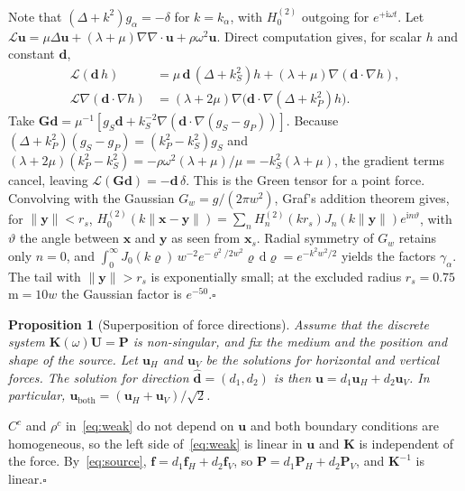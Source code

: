 \documentclass[preprint,12pt]{elsarticle}
\newcommand{\mbf}[1]{\mathbf{#1}}
\newcommand{\qedbox}{\hfill$\square$}
\newtheorem{proposition}{Proposition}
\begin{document}
\begin{pf}
Note that $(\Delta+k^2)g_\alpha=-\delta$ for $k=k_\alpha$, with $H_0^{(2)}$ outgoing for $e^{+\mathrm{i}\omega t}$. Let
$\mathcal{L}\mbf{u}=\mu\Delta\mbf{u}+(\lambda+\mu)\nabla\nabla\cdot\mbf{u}+\rho\omega^2\mbf{u}$. Direct computation gives, for scalar $h$ and constant $\mbf{d}$,
\begin{align*}
  \mathcal{L}(\mbf{d}\,h)&=\mu\,\mbf{d}\,(\Delta+k_S^2)h+(\lambda+\mu)\nabla(\mbf{d}\cdot\nabla h),\\
  \mathcal{L}\nabla(\mbf{d}\cdot\nabla h)&=(\lambda+2\mu)\nabla\bigl(\mbf{d}\cdot\nabla(\Delta+k_P^2)h\bigr).
\end{align*}
Take $\mbf{G}\mbf{d}=\mu^{-1}[g_S\mbf{d}+k_S^{-2}\nabla(\mbf{d}\cdot\nabla(g_S-g_P))]$. Because $(\Delta+k_P^2)(g_S-g_P)=(k_P^2-k_S^2)g_S$ and
$(\lambda+2\mu)(k_P^2-k_S^2)=-\rho\omega^2(\lambda+\mu)/\mu=-k_S^2(\lambda+\mu)$, the gradient terms cancel, leaving
$\mathcal{L}(\mbf{G}\mbf{d})=-\mbf{d}\,\delta$. This is the Green tensor for a point force. Convolving with the Gaussian $G_w=g/(2\pi w^2)$, Graf's addition theorem gives, for $\|\mbf{y}\|<r_s$,
$H_0^{(2)}(k\|\mbf{x}-\mbf{y}\|)=\sum_nH_n^{(2)}(kr_s)J_n(k\|\mbf{y}\|)e^{\mathrm{i}n\vartheta}$, with $\vartheta$ the angle between $\mbf{x}$ and $\mbf{y}$ as seen from $\mbf{x}_s$. Radial symmetry of $G_w$ retains only $n=0$, and
$\int_0^\infty J_0(k\varrho)\,w^{-2}e^{-\varrho^2/2w^2}\varrho\,\mathrm{d}\varrho=e^{-k^2w^2/2}$ yields the factors
$\gamma_\alpha$. The tail with $\|\mbf{y}\|>r_s$ is exponentially small; at the excluded radius $r_s=0.75$\,m$=10w$ the Gaussian factor is $e^{-50}$.\qedbox
\end{pf}

\begin{proposition}[Superposition of force directions]\label{prop:superposition}
Assume that the discrete system $\mbf{K}(\omega)\mbf{U}=\mbf{P}$ is non-singular, and fix the medium and the position and shape of the source. Let $\mbf{u}_H$ and $\mbf{u}_V$ be the solutions for horizontal and vertical forces. The solution for direction $\hat{\mbf{d}}=(d_1,d_2)$ is then $\mbf{u}=d_1\mbf{u}_H+d_2\mbf{u}_V$. In particular,
$\mbf{u}_{\mathrm{both}}=(\mbf{u}_H+\mbf{u}_V)/\sqrt{2}$.
\end{proposition}

\begin{pf}
$C^c$ and $\rho^c$ in~\eqref{eq:weak} do not depend on $\mbf{u}$ and both boundary conditions are homogeneous, so the left side of~\eqref{eq:weak} is linear in $\mbf{u}$ and
$\mbf{K}$ is independent of the force. By~\eqref{eq:source}, $\mbf{f}=d_1\mbf{f}_H+d_2\mbf{f}_V$, so $\mbf{P}=d_1\mbf{P}_H+d_2\mbf{P}_V$, and $\mbf{K}^{-1}$ is linear.\qedbox
\end{pf}
\end{document}
